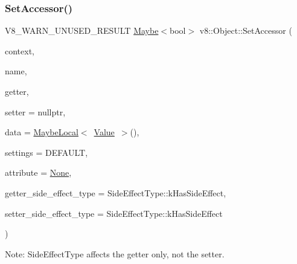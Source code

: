 \subsubsection{\texorpdfstring{Set\+Accessor()}{SetAccessor()}}
{\footnotesize\ttfamily V8\+\_\+\+W\+A\+R\+N\+\_\+\+U\+N\+U\+S\+E\+D\+\_\+\+R\+E\+S\+U\+LT \mbox{\hyperlink{classv8_1_1Maybe}{Maybe}}$<$bool$>$ v8\+::\+Object\+::\+Set\+Accessor (\begin{DoxyParamCaption}\item[{\mbox{\hyperlink{classv8_1_1Local}{Local}}$<$ Context $>$}]{context,  }\item[{\mbox{\hyperlink{classv8_1_1Local}{Local}}$<$ \mbox{\hyperlink{classv8_1_1Name}{Name}} $>$}]{name,  }\item[{Accessor\+Name\+Getter\+Callback}]{getter,  }\item[{Accessor\+Name\+Setter\+Callback}]{setter = {\ttfamily nullptr},  }\item[{\mbox{\hyperlink{classv8_1_1MaybeLocal}{Maybe\+Local}}$<$ \mbox{\hyperlink{classv8_1_1Value}{Value}} $>$}]{data = {\ttfamily \mbox{\hyperlink{classv8_1_1MaybeLocal}{Maybe\+Local}}$<$~\mbox{\hyperlink{classv8_1_1Value}{Value}}~$>$()},  }\item[{\mbox{\hyperlink{namespacev8_a31d8355cb043d7d2dda3f4a52760b64e}{Access\+Control}}}]{settings = {\ttfamily DEFAULT},  }\item[{\mbox{\hyperlink{namespacev8_a05f25f935e108a1ea2d150e274602b87}{Property\+Attribute}}}]{attribute = {\ttfamily \mbox{\hyperlink{namespacev8_a05f25f935e108a1ea2d150e274602b87a7ab4d58719c33b3ea2dfaefa29b111df}{None}}},  }\item[{\mbox{\hyperlink{namespacev8_a29711319c2b9fc7716d65faee2f7b9cb}{Side\+Effect\+Type}}}]{getter\+\_\+side\+\_\+effect\+\_\+type = {\ttfamily SideEffectType\+:\+:kHasSideEffect},  }\item[{\mbox{\hyperlink{namespacev8_a29711319c2b9fc7716d65faee2f7b9cb}{Side\+Effect\+Type}}}]{setter\+\_\+side\+\_\+effect\+\_\+type = {\ttfamily SideEffectType\+:\+:kHasSideEffect} }\end{DoxyParamCaption})}

Note\+: Side\+Effect\+Type affects the getter only, not the setter. \mbox{\label{classv8_1_1Object_a0ccba69581f0b5e4e672bab90f26879b}} 
